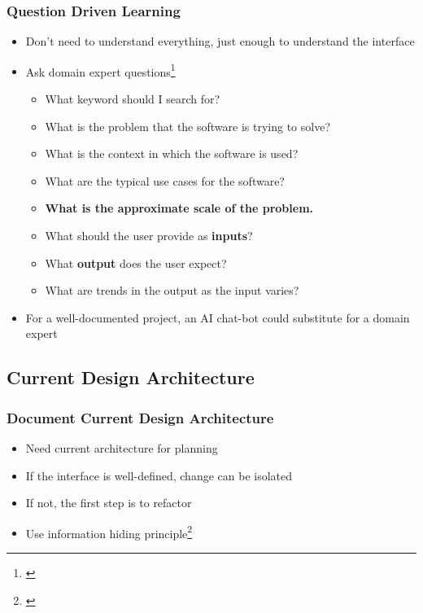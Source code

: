 \documentclass{beamer}
\begin{document}
\begin{frame}

\frametitle{Question Driven Learning}

\begin{itemize}
  \item Don't need to understand everything, just enough to understand the interface
  \item Ask domain expert questions\footnote{\citet{DuAndSmith2025-paper}}
  \begin{itemize}
    \item What keyword should I search for?
    \item What is the problem that the software is trying to solve?
    \item What is the context in which the software is used?
    \item What are the typical use cases for the software?
    \item \textbf{What is the approximate scale of the problem.}
    \item What should the user provide as \textbf{inputs}?
    \item What \textbf{output} does the user expect?
    \item What are trends in the output as the input varies?
  \end{itemize}
  \item For a well-documented project, an AI chat-bot could substitute for a domain expert
\end{itemize}

\end{frame}


\subsection[Curr.\ Architec.?]{Current Design Architecture}


\begin{frame}

\frametitle{Document Current Design Architecture}

\begin{itemize}

\item Need current architecture for planning
\item If the interface is well-defined, change can be isolated
\item If not, the first step is to refactor
\item Use information hiding principle\footnote{\citet{parnas_1972}}

\end{itemize}

\end{frame}
\end{document}
